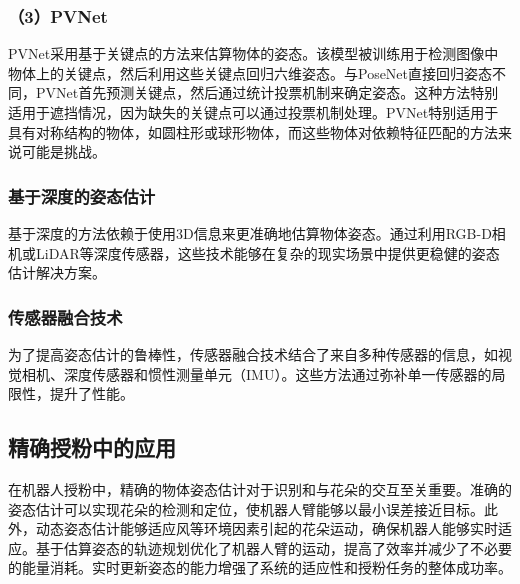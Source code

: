 \subsubsection*{（3）PVNet}
PVNet采用基于关键点的方法来估算物体的姿态。该模型被训练用于检测图像中物体上的关键点，然后利用这些关键点回归六维姿态。与PoseNet直接回归姿态不同，PVNet首先预测关键点，然后通过统计投票机制来确定姿态。这种方法特别适用于遮挡情况，因为缺失的关键点可以通过投票机制处理。PVNet特别适用于具有对称结构的物体，如圆柱形或球形物体，而这些物体对依赖特征匹配的方法来说可能是挑战。
\subsubsection{基于深度的姿态估计}
基于深度的方法依赖于使用3D信息来更准确地估算物体姿态。通过利用RGB-D相机或LiDAR等深度传感器，这些技术能够在复杂的现实场景中提供更稳健的姿态估计解决方案。
\subsubsection{传感器融合技术}
为了提高姿态估计的鲁棒性，传感器融合技术结合了来自多种传感器的信息，如视觉相机、深度传感器和惯性测量单元（IMU）。这些方法通过弥补单一传感器的局限性，提升了性能。
\subsection{精确授粉中的应用}
在机器人授粉中，精确的物体姿态估计对于识别和与花朵的交互至关重要。准确的姿态估计可以实现花朵的检测和定位，使机器人臂能够以最小误差接近目标。此外，动态姿态估计能够适应风等环境因素引起的花朵运动，确保机器人能够实时适应。基于估算姿态的轨迹规划优化了机器人臂的运动，提高了效率并减少了不必要的能量消耗。实时更新姿态的能力增强了系统的适应性和授粉任务的整体成功率。

